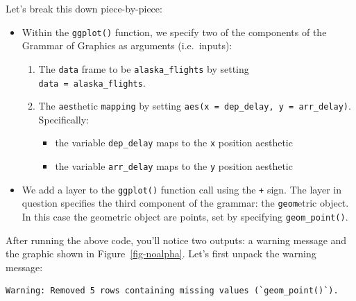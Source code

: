 \documentclass[
  letterpaper,
  DIV=11,
  numbers=noendperiod]{scrreprt}
\providecommand{\tightlist}{%
  \setlength{\itemsep}{0pt}\setlength{\parskip}{0pt}}\usepackage{longtable,booktabs,array}
\theoremstyle{definition}
\theoremstyle{remark}
\begin{document}
Let's break this down piece-by-piece:

\begin{itemize}
\tightlist
\item
  Within the \texttt{ggplot()} function, we specify two of the
  components of the Grammar of Graphics as arguments (i.e.~inputs):

  \begin{enumerate}
  \def\labelenumi{\arabic{enumi}.}
  \tightlist
  \item
    The \texttt{data} frame to be \texttt{alaska\_flights} by setting
    \texttt{data\ =\ alaska\_flights}.
  \item
    The \texttt{aes}thetic \texttt{mapping} by setting
    \texttt{aes(x\ =\ dep\_delay,\ y\ =\ arr\_delay)}. Specifically:

    \begin{itemize}
    \tightlist
    \item
      the variable \texttt{dep\_delay} maps to the \texttt{x} position
      aesthetic
    \item
      the variable \texttt{arr\_delay} maps to the \texttt{y} position
      aesthetic
    \end{itemize}
  \end{enumerate}
\item
  We add a layer to the \texttt{ggplot()} function call using the
  \texttt{+} sign. The layer in question specifies the third component
  of the grammar: the \texttt{geom}etric object. In this case the
  geometric object are points, set by specifying \texttt{geom\_point()}.
\end{itemize}

After running the above code, you'll notice two outputs: a warning
message and the graphic shown in Figure~\ref{fig-noalpha}. Let's first
unpack the warning message:

\begin{verbatim}
Warning: Removed 5 rows containing missing values (`geom_point()`).
\end{verbatim}
\end{document}
